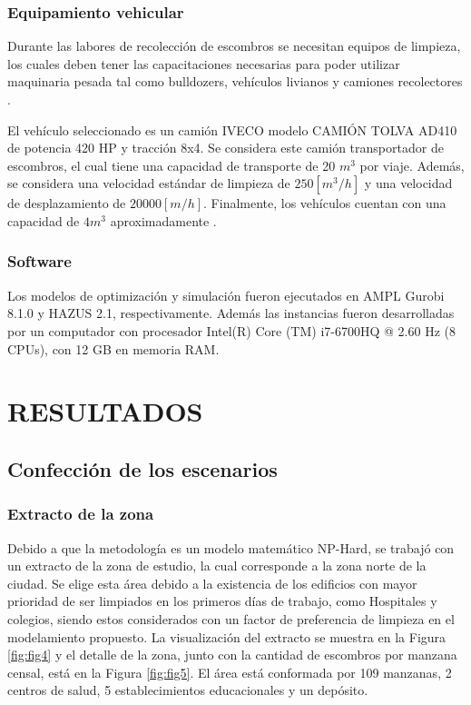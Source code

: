 \documentclass[12pt,a4paper]{article}
\begin{document}
\subsubsection{Equipamiento vehicular}

Durante las labores de recolección de escombros se necesitan equipos de limpieza, los cuales deben tener las capacitaciones necesarias para poder utilizar maquinaria pesada tal como bulldozers, vehículos livianos y camiones recolectores \citep{Kasaei2016}.

El vehículo seleccionado es un camión IVECO modelo CAMIÓN TOLVA AD410 de potencia 420 HP y tracción 8x4. Se considera este camión transportador de escombros, el cual tiene una capacidad de transporte de 20 $m^3$ por viaje. Además, se considera una velocidad estándar de limpieza de $250 [m^{3}/h]$ \citep{Feng2003} y una velocidad de desplazamiento de $20000 [m/h]$. Finalmente, los vehículos cuentan con una capacidad de $4 m^{3}$ aproximadamente \citep{CAT}.

\subsubsection{Software}

Los modelos de optimización y simulación fueron ejecutados en AMPL Gurobi 8.1.0 y HAZUS 2.1, respectivamente. Además las instancias fueron desarrolladas por un computador con procesador Intel(R) Core (TM) i7-6700HQ @ 2.60 Hz (8 CPUs), con 12 GB en memoria RAM.

\section{RESULTADOS}

\subsection{Confección de los escenarios}

\subsubsection{Extracto de la zona}

Debido a que la metodología es un modelo matemático NP-Hard, se trabajó con un extracto de la zona de estudio, la cual corresponde a la zona norte de la ciudad. Se elige esta área debido a la  existencia de los edificios con mayor prioridad de ser limpiados en los primeros días de trabajo, como Hospitales y colegios, siendo estos considerados con un factor de preferencia de limpieza en el modelamiento propuesto.
La visualización del extracto se muestra en la Figura \ref{fig:fig4} y el detalle de la zona, junto con la cantidad de escombros por manzana censal, está en la Figura \ref{fig:fig5}. El área está conformada por 109 manzanas, 2 centros de salud, 5 establecimientos educacionales y un depósito.
\end{document}
